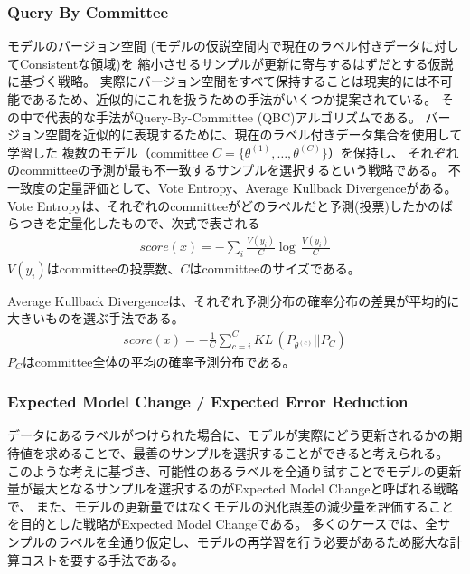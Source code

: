 \subsubsection{Query By Committee}
モデルのバージョン空間 (モデルの仮説空間内で現在のラベル付きデータに対してConsistentな領域)を
縮小させるサンプルが更新に寄与するはずだとする仮説に基づく戦略。
実際にバージョン空間をすべて保持することは現実的には不可能であるため、近似的にこれを扱うための手法がいくつか提案されている。
その中で代表的な手法がQuery-By-Committee (QBC)\cite{seung1992query}アルゴリズムである。
バージョン空間を近似的に表現するために、現在のラベル付きデータ集合を使用して学習した
複数のモデル（committee $C=\{ \theta^{(1)}, \dots, \theta^{(C)}\}$）を保持し、
それぞれのcommitteeの予測が最も不一致するサンプルを選択するという戦略である。
不一致度の定量評価として、Vote Entropy、Average Kullback Divergenceがある。
Vote Entropyは、それぞれのcommitteeがどのラベルだと予測(投票)したかのばらつきを定量化したもので、次式で表される
\begin{eqnarray}
    score(x) =  - \sum_i \frac{V(y_i)}{C} \log \, \frac{V(y_i)}{C}
\end{eqnarray}
$V(y_i)$はcommitteeの投票数、$C$はcommitteeのサイズである。

Average Kullback Divergenceは、それぞれ予測分布の確率分布の差異が平均的に大きいものを選ぶ手法である。
\begin{eqnarray}
    score(x) =  -  \frac{1}{C} \sum_{c=i}^C KL \, (P_{\theta^{(c)}} || P_C)
\end{eqnarray}
$P_C$はcommittee全体の平均の確率予測分布である。

\subsubsection{Expected Model Change / Expected Error Reduction}
データにあるラベルがつけられた場合に、モデルが実際にどう更新されるかの期待値を求めることで、最善のサンプルを選択することができると考えられる。
このような考えに基づき、可能性のあるラベルを全通り試すことでモデルの更新量が最大となるサンプルを選択するのがExpected Model Changeと呼ばれる戦略で、
また、モデルの更新量ではなくモデルの汎化誤差の減少量を評価することを目的とした戦略がExpected Model Changeである。
多くのケースでは、全サンプルのラベルを全通り仮定し、モデルの再学習を行う必要があるため膨大な計算コストを要する手法である。

